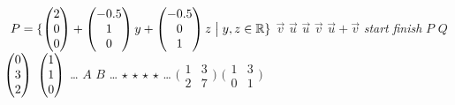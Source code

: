 \documentclass{book}
\begin{document}
\stopmpxshipout
\mpxshipout%
\hbox{\hspace*{0.05in} \scriptsize 
                       $P=\mbox{$\{\begin{pmatrix} 2 \\ 0 \\ 0 \end{pmatrix}
		               +\begin{pmatrix} -0.5 \\ 1 \\ 0 \end{pmatrix} y
		               +\begin{pmatrix} -0.5 \\ 0 \\ 1 \end{pmatrix} z
		               \bigm| y,z\in\mathbb{R}\}$}$}%
\stopmpxshipout
\mpxshipout%
{\scriptsize $\vec{v}$}%
\stopmpxshipout
\mpxshipout%
{\scriptsize $\vec{u}$}%
\stopmpxshipout
\mpxshipout%
{\scriptsize $\vec{u}$}%
\stopmpxshipout
\mpxshipout%
{\scriptsize $\vec{v}$}%
\stopmpxshipout
\mpxshipout%
{\scriptsize $\vec{u}+\vec{v}$}%
\stopmpxshipout
\mpxshipout%
{\scriptsize\textit{start}}%
\stopmpxshipout
\mpxshipout%
{\scriptsize\textit{finish}}%
\stopmpxshipout
\mpxshipout%
{\scriptsize $P$}%
\stopmpxshipout
\mpxshipout%
{\scriptsize $Q$}%
\stopmpxshipout
\mpxshipout%
{\scriptsize
                          $\begin{pmatrix} 0 \\ 3 \\ 2 \end{pmatrix}$}%
\stopmpxshipout
\mpxshipout%
{\scriptsize
                         $\begin{pmatrix} 1 \\ 1 \\ 0 \end{pmatrix}$}%
\stopmpxshipout
\mpxshipout%
{\scriptsize \ldots}%
\stopmpxshipout
\mpxshipout%
{\scriptsize $A$}%
\stopmpxshipout
\mpxshipout%
{\scriptsize $B$}%
\stopmpxshipout
\mpxshipout%
{\scriptsize \ldots}%
\stopmpxshipout
\mpxshipout%
{\scriptsize $\star$}%
\stopmpxshipout
\mpxshipout%
{\scriptsize $\star$}%
\stopmpxshipout
\mpxshipout%
{\scriptsize $\star$}%
\stopmpxshipout
\mpxshipout%
{\scriptsize $\star$}%
\stopmpxshipout
\mpxshipout%
{\scriptsize \ldots}%
\stopmpxshipout
\mpxshipout%
{\tiny       $\bigl(\begin{smallmatrix}
                                1  &3  \\
                                2  &7
                              \end{smallmatrix}\bigr)$}%
\stopmpxshipout
\mpxshipout%
{\tiny       $\bigl(\begin{smallmatrix}
                                1  &3  \\
                                0  &1
                              \end{smallmatrix}\bigr)$}%
\end{document}
